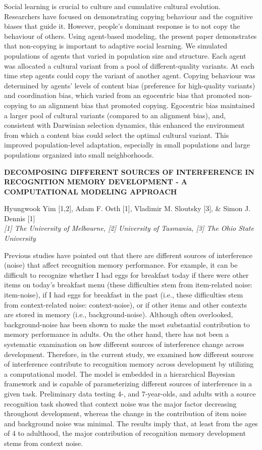\documentclass[]{article}
\begin{document}
Social learning is crucial to culture and cumulative cultural evolution.
Researchers have focused on demonstrating copying behaviour and the
cognitive biases that guide it. However, people's dominant response is
to not copy the behaviour of others. Using agent-based modeling, the
present paper demonstrates that non-copying is important to adaptive
social learning. We simulated populations of agents that varied in
population size and structure. Each agent was allocated a cultural
variant from a pool of different-quality variants. At each time step
agents could copy the variant of another agent. Copying behaviour was
determined by agents' levels of content bias (preference for
high-quality variants) and coordination bias, which varied from an
egocentric bias that promoted non-copying to an alignment bias that
promoted copying. Egocentric bias maintained a larger pool of cultural
variants (compared to an alignment bias), and, consistent with Darwinian
selection dynamics, this enhanced the environment from which a content
bias could select the optimal cultural variant. This improved
population-level adaptation, especially in small populations and large
populations organized into small neighborhoods.\\
\pagebreak  

\textbf{DECOMPOSING DIFFERENT SOURCES OF INTERFERENCE IN RECOGNITION
MEMORY DEVELOPMENT - A COMPUTATIONAL MODELING APPROACH}

Hyungwook Yim {[}1,2{]}, Adam F. Osth {[}1{]}, Vladimir M. Sloutsky
{[}3{]}, \& Simon J. Dennis {[}1{]}\\
\emph{{[}1{]} The University of Melbourne, {[}2{]} University of
Tasmania, {[}3{]} The Ohio State University}

Previous studies have pointed out that there are different sources of
interference (noise) that affect recognition memory performance. For
example, it can be difficult to recognize whether I had eggs for
breakfast today if there were other items on today's breakfast menu
(these difficulties stem from item-related noise: item-noise), if I had
eggs for breakfast in the past (i.e., these difficulties stem from
context-related noise: context-noise), or if other items and other
contexts are stored in memory (i.e., background-noise). Although often
overlooked, background-noise has been shown to make the most substantial
contribution to memory performance in adults. On the other hand, there
has not been a systematic examination on how different sources of
interference change across development. Therefore, in the current study,
we examined how different sources of interference contribute to
recognition memory across development by utilizing a computational
model. The model is embedded in a hierarchical Bayesian framework and is
capable of parameterizing different sources of interference in a given
task. Preliminary data testing 4-, and 7-year-olds, and adults with a
source recognition task showed that context noise was the major factor
decreasing throughout development, whereas the change in the
contribution of item noise and background noise was minimal. The results
imply that, at least from the ages of 4 to adulthood, the major
contribution of recognition memory development stems from context
noise.\\
\pagebreak  
\end{document}

